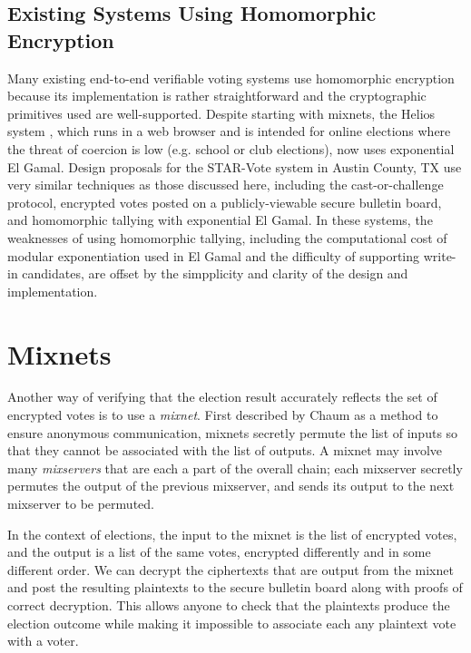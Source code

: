 \subsection{Existing Systems Using Homomorphic Encryption} \label{evote:homomorphic:existing}

Many existing end-to-end verifiable voting systems use homomorphic encryption because its implementation is rather straightforward and the cryptographic primitives used are well-supported. Despite starting with mixnets, the Helios system \cite{adida-helios}, which runs in a web browser and is intended for online elections where the threat of coercion is low (e.g. school or club elections), now uses exponential El Gamal. Design proposals for the STAR-Vote system in Austin County, TX \cite{starvote} use very similar techniques as those discussed here, including the cast-or-challenge protocol, encrypted votes posted on a publicly-viewable secure bulletin board, and homomorphic tallying with exponential El Gamal. In these systems, the weaknesses of using homomorphic tallying, including the computational cost of modular exponentiation used in El Gamal and the difficulty of supporting write-in candidates, are offset by the simpplicity and clarity of the design and implementation.

\section{Mixnets} \label{evote:mixnets}

Another way of verifying that the election result accurately reflects the set of encrypted votes is to use a \emph{mixnet}. First described by Chaum \cite{chaum81} as a method to ensure anonymous communication, mixnets secretly permute the list of inputs so that they cannot be associated with the list of outputs. A mixnet may involve many \emph{mixservers} that are each a part of the overall chain; each mixserver secretly permutes the output of the previous mixserver, and sends its output to the next mixserver to be permuted.

In the context of elections, the input to the mixnet is the list of encrypted votes, and the output is a list of the same votes, encrypted differently and in some different order. We can decrypt the ciphertexts that are output from the mixnet and post the resulting plaintexts to the secure bulletin board along with proofs of correct decryption. This allows anyone to check that the plaintexts produce the election outcome while making it impossible to associate each any plaintext vote with a voter.

